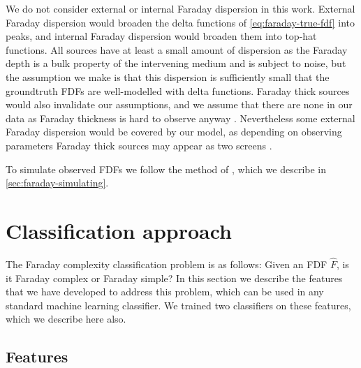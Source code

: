     We do not consider external or internal Faraday dispersion in this work. External Faraday dispersion would broaden the delta functions of \autoref{eq:faraday-true-fdf} into peaks, and internal Faraday dispersion would broaden them into top-hat functions. All sources have at least a small amount of dispersion as the Faraday depth is a bulk property of the intervening medium and is subject to noise, but the assumption we make is that this dispersion is sufficiently small that the groundtruth FDFs are well-modelled with delta functions. Faraday thick sources would also invalidate our assumptions, and we assume that there are none in our data as Faraday thickness is hard to observe anyway \citeneeded{}. Nevertheless some external Faraday dispersion would be covered by our model, as depending on observing parameters Faraday thick sources may appear as two screens \citep{vaneck17faraday}.

    To simulate observed FDFs we follow the method of \citet{brown_classifying_2018}, which we describe in \autoref{sec:faraday-simulating}.

\section{Classification approach}
\label{sec:faraday-approach}

  The Faraday complexity classification problem is as follows: Given an FDF $\hat F$, is it Faraday complex or Faraday simple? In this section we describe the features that we have developed to address this problem, which can be used in any standard machine learning classifier. We trained two classifiers on these features, which we describe here also.

  \subsection{Features}
  \label{sec:faraday-scores-method}

